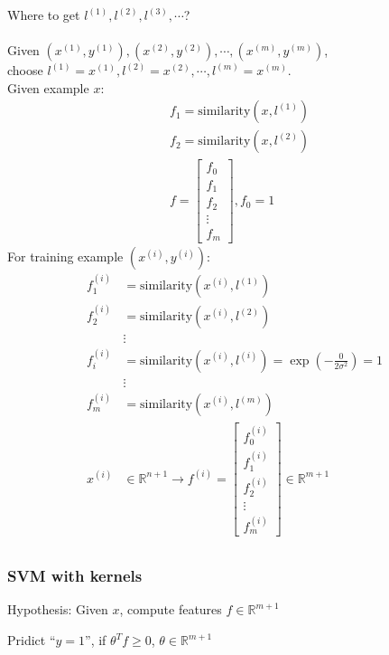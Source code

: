 Where to get $l^{(1)}, l^{(2)}, l^{(3)}, \cdots$?\\\\
Given $(x^{(1)}, y^{(1)}), (x^{(2)}, y^{(2)}), \cdots, (x^{(m)}, y^{(m)})$,\\
choose $l^{(1)} = x^{(1)}, l^{(2)} = x^{(2)}, \cdots, l^{(m)} = x^{(m)}$.\\
Given example $x$:\\
\begin{align*}
& f_1 = \text{similarity}(x, l^{(1)})\\
& f_2 = \text{similarity}(x, l^{(2)})\\
&f = \begin{bmatrix}f_0 \\ f_1 \\ f_2 \\ \vdots \\ f_m\end{bmatrix}, f_0 = 1
\end{align*}
For training example $(x^{(i)}, y^{(i)})$:\\
\begin{align*}
f_1^{(i)} &= \text{similarity}(x^{(i)}, l^{(1)})\\
f_2^{(i)} &= \text{similarity}(x^{(i)}, l^{(2)})\\
&\vdots\\
f_i^{(i)} &= \text{similarity}(x^{(i)}, l^{(i)}) = \exp\left(-\frac{0}{2\sigma^2}\right) = 1\\
&\vdots\\
f_m^{(i)} &= \text{similarity}(x^{(i)}, l^{(m)})\\
x^{(i)} & \in \mathbb{R}^{n+1} \rightarrow f ^{(i)}= \begin{bmatrix}f_0^{(i)} \\ f_1^{(i)} \\ f_2^{(i)} \\ \vdots \\ f_m^{(i)}\end{bmatrix} \in \mathbb{R}^{m+1}\\
\end{align*}

\subsubsection{SVM with kernels}

Hypothesis: Given $x$, compute features $f \in \mathbb{R}^{m+1}$

Pridict ``$y = 1$'', if $\theta^Tf \geq 0$, $\theta \in \mathbb{R}^{m+1}$

